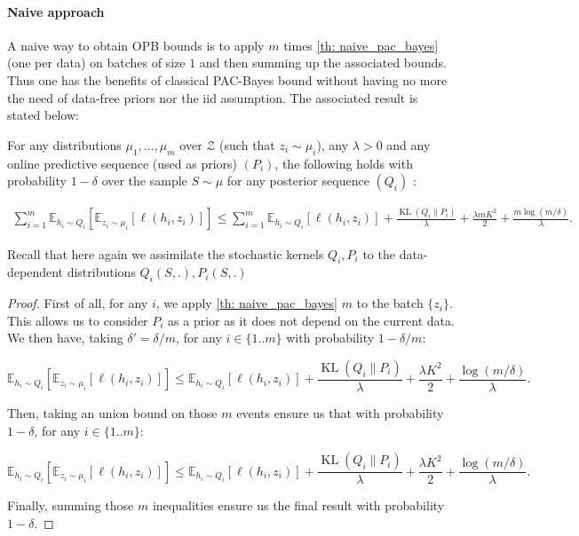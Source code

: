 \paragraph{Naive approach} A naive way to obtain OPB bounds is to apply $m$ times \cref{th: naive_pac_bayes} (one per data) on batches of size $1$ and then summing up the associated bounds. Thus one has the benefits of classical PAC-Bayes bound without having no more the need of data-free priors nor the iid assumption. The associated result is stated below:

\begin{theorem}
  \label{th: naive_approach}
  For any distributions $\mu_1,...,\mu_m$ over $\mathcal{Z}$ (such that $z_i\sim \mu_i$), any $\lambda>0$ and any online predictive sequence (used as priors) $(P_i)$, the following holds with probability $1-\delta$ over the sample $S\sim\mu$ for any posterior sequence $(Q_i)$ :


  \begin{align*}
    \sum_{i=1}^m \mathbb{E}_{h_i\sim Q_{i}}\left[ \mathbb{E}_{z_i\sim \mu_i}[\ell(h_i,z_i)]    \right] \leq \sum_{i=1}^m \mathbb{E}_{h_i\sim Q_{i}}\left[ \ell(h_i,z_i) \right] +
    \frac{\operatorname{KL}(Q_{i}\| P_i)}{\lambda} + \frac{\lambda m K^2}{2} + \frac{m\log(m/\delta)}{\lambda}.
  \end{align*}
\end{theorem}

Recall that here again we assimilate the stochastic kernels $Q_i, P_i$ to the data-dependent distributions $Q_i(S,.), P_i(S,.)$

\begin{proof}
  First of all, for any $i$, we apply \cref{th: naive_pac_bayes} $m$ to the batch $\{ z_i\}$. This allows us to consider $P_i$ as a prior as it does not depend on the current data. We then have, taking $\delta'=\delta/m$, for any $i\in\{1..m\}$ with probability $ 1- \delta/m$:

  \[ \mathbb{E}_{h_i\sim Q_{i}}\left[ \mathbb{E}_{z_i\sim \mu_i}[\ell(h_i,z_i)]    \right] \leq  \mathbb{E}_{h_i\sim Q_{i}}\left[ \ell(h_i,z_i) \right] +
  \frac{\operatorname{KL}(Q_{i}\| P_i)}{\lambda} + \frac{\lambda K^2}{2} + \frac{\log(m/\delta)}{\lambda}. \]

  Then, taking an union bound on those $m$ events ensure us that with probability $1-\delta$, for any $i\in\{1..m\}$:

  \[ \mathbb{E}_{h_i\sim Q_{i}}\left[ \mathbb{E}_{z_i\sim \mu_i}[\ell(h_i,z_i)]    \right] \leq  \mathbb{E}_{h_i\sim Q_{i}}\left[ \ell(h_i,z_i) \right] +
  \frac{\operatorname{KL}(Q_{i}\| P_i)}{\lambda} + \frac{\lambda  K^2}{2} + \frac{\log(m/\delta)}{\lambda}. \]


  Finally, summing those $m$ inequalities ensure us the final result with probability $1-\delta$.

\end{proof}

